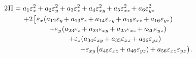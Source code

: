 \nopagebreak\vspace{-0.2em}
\begin{equation}\label{elasticenergylooongcartesian}
\begin{gathered}
\hspace{-5em}
2 \hspace{.1ex} \potential
= a_1 \varepsilon^2_{x} \hspace{-0.1ex}
+ a_2 \varepsilon^2_{y} \hspace{-0.1ex}
+ a_3 \varepsilon^2_{z} \hspace{-0.1ex}
+ a_4 \varepsilon^2_{xy} \hspace{-0.2ex}
+ a_5 \varepsilon^2_{xz} \hspace{-0.2ex}
+ a_6 \varepsilon^2_{yz}
\\[-0.1em]
%
\hspace{.2em}
+ 2 \hspace{.2ex} \bigl[ \hspace{.1ex}
\varepsilon_{x} \hspace{.1ex}
( a_{12} \varepsilon_{y} \hspace{-0.2ex}
+ a_{13} \varepsilon_{z} \hspace{-0.2ex}
+ a_{14} \varepsilon_{xy} \hspace{-0.2ex}
+ a_{15} \varepsilon_{xz} \hspace{-0.2ex}
+ a_{16} \varepsilon_{yz} ) \hspace{-0.11ex}
\\[-0.1em]
%
\hspace{3em}
+ \varepsilon_{y} \hspace{.1ex} (
a_{23} \varepsilon_{z} \hspace{-0.2ex}
+ a_{24} \varepsilon_{xy} \hspace{-0.2ex}
+ a_{25} \varepsilon_{xz} \hspace{-0.2ex}
+ a_{26} \varepsilon_{yz}
)
\\[-0.1em]
%
\hspace{5em}
+ \varepsilon_{z} ( a_{34} \varepsilon_{xy} \hspace{-0.2ex}
+ a_{35} \varepsilon_{xz} \hspace{-0.2ex}
+ a_{36} \varepsilon_{yz} )
\\[-0.1em]
%
\hspace{11em}
+ \varepsilon_{xy} \hspace{.1ex} \bigl(
a_{45} \varepsilon_{xz} \hspace{-0.2ex}
+ a_{46} \varepsilon_{yz} ) \hspace{-0.11ex}
+ a_{56} \varepsilon_{xz} \varepsilon_{yz} \hspace{.1ex}
\bigr)
\hspace{.1ex}
.
\end{gathered}
\end{equation}

